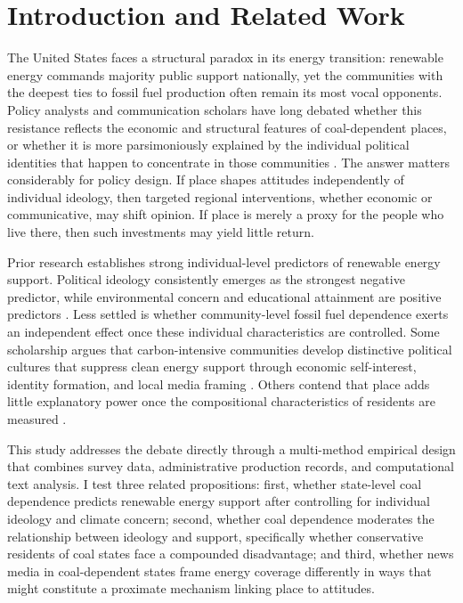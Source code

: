 \documentclass[9pt,twoside]{pnas-new}
\begin{document}
\section*{Introduction and Related Work}
The United States faces a structural paradox in its energy transition: renewable
energy commands majority public support nationally, yet the communities with the
deepest ties to fossil fuel production often remain its most vocal opponents.
Policy analysts and communication scholars have long debated whether this
resistance reflects the economic and structural features of coal-dependent places,
or whether it is more parsimoniously explained by the individual political
identities that happen to concentrate in those communities \cite{Stokes2020,
Mildenberger2019, Carley2020}. The answer matters considerably for policy design.
If place shapes attitudes independently of individual ideology, then targeted
regional interventions, whether economic or communicative, may shift opinion. If
place is merely a proxy for the people who live there, then such investments may
yield little return.

Prior research establishes strong individual-level predictors of renewable energy
support. Political ideology consistently emerges as the strongest negative
predictor, while environmental concern and educational attainment are positive
predictors \cite{Ansolabehere2014, Hess2014, Krupnick2010}. Less settled is
whether community-level fossil fuel dependence exerts an independent effect once
these individual characteristics are controlled. Some scholarship argues that
carbon-intensive communities develop distinctive political cultures that suppress
clean energy support through economic self-interest, identity formation, and local
media framing \cite{Mildenberger2019, Jacobs2016}. Others contend that place
adds little explanatory power once the compositional characteristics of residents
are measured \cite{Carley2020, Ansolabehere2014}.

This study addresses the debate directly through a multi-method empirical design
that combines survey data, administrative production records, and computational
text analysis. I test three related propositions: first, whether state-level coal
dependence predicts renewable energy support after controlling for individual
ideology and climate concern; second, whether coal dependence moderates the
relationship between ideology and support, specifically whether conservative
residents of coal states face a compounded disadvantage; and third, whether news
media in coal-dependent states frame energy coverage differently in ways that might
constitute a proximate mechanism linking place to attitudes.
\end{document}
